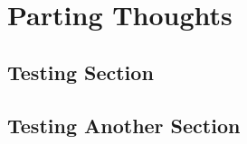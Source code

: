 

\chapter[Parting Thoughts]{Parting Thoughts}\label{ch-parting}


\section{Testing Section}

\section{Testing Another Section}

